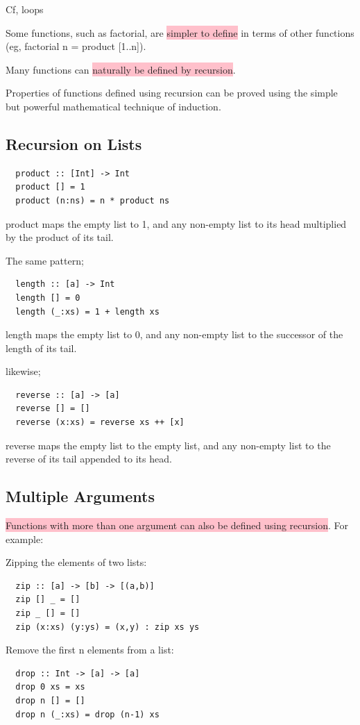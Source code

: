 \documentclass[tikz,border=10pt]{project_plan}
\begin{document}
Cf, loops

Some functions, such as factorial, are \colorbox{pink}{simpler to define}
in terms of other functions (eg, factorial n = product
  [1..n]).

Many functions can \colorbox{pink}{naturally be defined by recursion}.

Properties of functions defined using recursion can be
proved using the simple but powerful mathematical
technique of induction.

\subsection{Recursion on Lists}

\begin{lstlisting}
  product :: [Int] -> Int
  product [] = 1
  product (n:ns) = n * product ns
\end{lstlisting}
product maps the empty list to 1, and any
non-empty list to its head multiplied by the
product of its tail.

The same pattern;
\begin{lstlisting}
  length :: [a] -> Int
  length [] = 0
  length (_:xs) = 1 + length xs
\end{lstlisting}
length maps the empty list to 0, and any
non-empty list to the successor of the
length of its tail.

likewise;
\begin{lstlisting}
  reverse :: [a] -> [a]
  reverse [] = []
  reverse (x:xs) = reverse xs ++ [x]
\end{lstlisting}

reverse maps the empty list to the empty list, and
any non-empty list to the reverse of its tail
appended to its head.

\subsection{Multiple Arguments}

\colorbox{pink}{Functions with more than one argument can also be
  defined using recursion}. For example:

Zipping the elements of two lists:
\begin{lstlisting}
  zip :: [a] -> [b] -> [(a,b)]
  zip [] _ = []
  zip _ [] = []
  zip (x:xs) (y:ys) = (x,y) : zip xs ys
\end{lstlisting}

Remove the first n elements from a list:
\begin{lstlisting}
  drop :: Int -> [a] -> [a]
  drop 0 xs = xs
  drop n [] = []
  drop n (_:xs) = drop (n-1) xs
\end{lstlisting}
\end{document}
